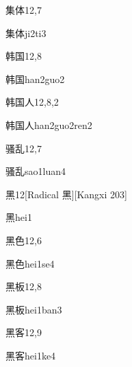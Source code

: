 \begin{entry}{集体}{12,7}
  \begin{phonetics}{集体}{ji2ti3}
  \end{phonetics}
\end{entry}

\begin{entry}{韩国}{12,8}
  \begin{phonetics}{韩国}{han2guo2}
  \end{phonetics}
\end{entry}

\begin{entry}{韩国人}{12,8,2}
  \begin{phonetics}{韩国人}{han2guo2ren2}
  \end{phonetics}
\end{entry}

\begin{entry}{骚乱}{12,7}
  \begin{phonetics}{骚乱}{sao1luan4}
  \end{phonetics}
\end{entry}

\begin{entry}{黑}{12}[Radical ⿊][Kangxi 203]
  \begin{phonetics}{黑}{hei1}
  \end{phonetics}
\end{entry}

\begin{entry}{黑色}{12,6}
  \begin{phonetics}{黑色}{hei1se4}
  \end{phonetics}
\end{entry}

\begin{entry}{黑板}{12,8}
  \begin{phonetics}{黑板}{hei1ban3}
  \end{phonetics}
\end{entry}

\begin{entry}{黑客}{12,9}
  \begin{phonetics}{黑客}{hei1ke4}
  \end{phonetics}
\end{entry}


